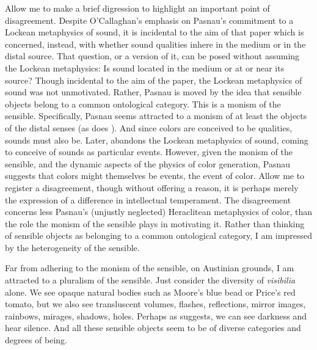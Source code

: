Allow me to make a brief digression to highlight an important point of disagreement. Despite O'Callaghan's \citeyearpar{OCallaghan:2009aa} emphasis on Pasnau's \citeyearpar{Pasnau:1999ss} commitment to a Lockean metaphysics of sound, it is incidental to the aim of that paper which is concerned, instead, with whether sound qualities inhere in the medium or in the distal source. That question, or a version of it, can be posed without assuming the Lockean metaphysics: Is sound located in the medium or at or near its source? Though incidental to the aim of the paper, the Lockean metaphysics of sound was not unmotivated. Rather, Pasnau is moved by the idea that sensible objects belong to a common ontological category. This is a monism of the sensible. Specifically, Pasnau seems attracted to a monism of at least the objects of the distal senses (as does \citealt{Kulvicki:2008aa}). And since colors are conceived to be qualities, sounds must also be. Later, \citet{Pasnau:2009ys} abandons the Lockean metaphysics of sound, coming to conceive of sounds as particular events. However, given the monism of the sensible, and the dynamic aspects of the physics of color generation, Pasnau suggests that colors might themselves be events, the event of color. Allow me to register a disagreement, though without offering a reason, it is perhaps merely the expression of a difference in intellectual temperament. The disagreement concerns less Pasnau's (unjustly neglected) Heraclitean metaphysics of color, than the role the monism of the sensible plays in motivating it. Rather than thinking of sensible objects as belonging to a common ontological category, I am impressed by the heterogeneity of the sensible. 

Far from adhering to the monism of the sensible, on Austinian grounds, I am attracted to a pluralism of the sensible. Just consider the diversity of \emph{visibilia} alone. We see opaque natural bodies such as Moore's \citeyearpar{Moore:1903uo} blue bead or Price's \citeyearpar{Price:1932fk} red tomato, but we also see transluscent volumes, flashes, reflections, mirror images, rainbows, mirages, shadows, holes. Perhaps as \citet{Sorensen:2004jk,Sorensen:2008kx,Sorensen:2009aa} suggests, we can see darkness and hear silence. And all these sensible objects seem to be of diverse categories and degrees of being.


